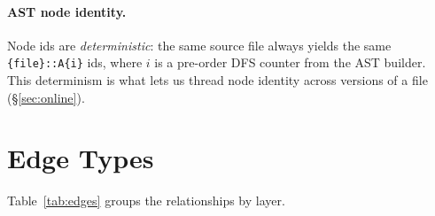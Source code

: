 \documentclass[11pt,a4paper]{article}
\begin{document}
	\paragraph{AST node identity.} Node ids are \emph{deterministic}: the same
	source file always yields the same \texttt{\{file\}::A\{i\}} ids, where $i$ is a
	pre-order DFS counter from the AST builder. This determinism is what lets us
	thread node identity across versions of a file (\S\ref{sec:online}).
	
	\section{Edge Types}
	Table~\ref{tab:edges} groups the relationships by layer.
	
\end{document}
